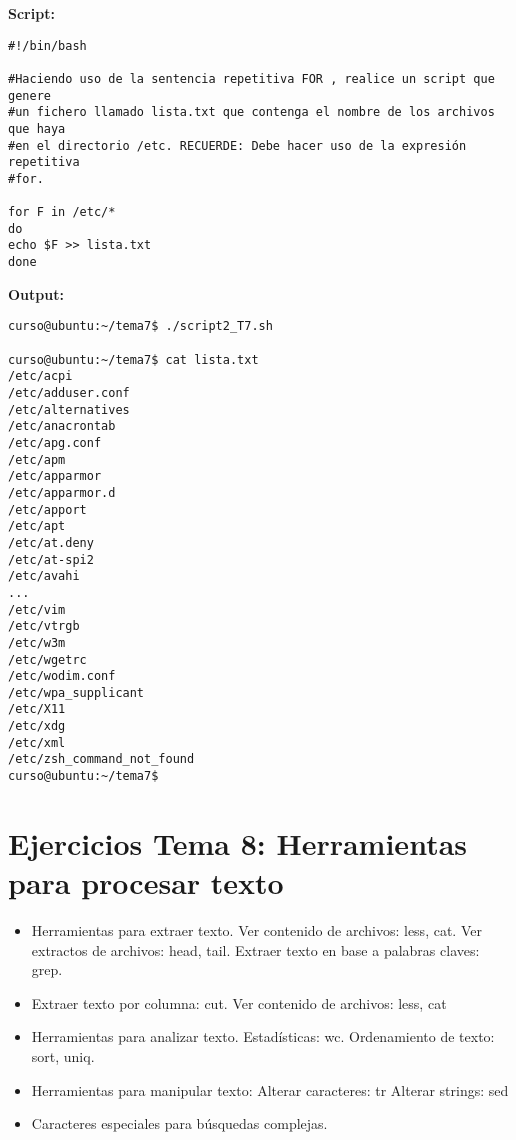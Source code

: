 \documentclass[a4paper,11pt,spanish]{article} %
\newenvironment{myscriptlisting}
{\begin{list}{}{\setlength{\leftmargin}{1em}}\item\scriptsize\bfseries}
{\end{list}}
\begin{document}
\textbf{Script:}

\begin{myscriptlisting}
 \begin{verbatim}
#!/bin/bash

#Haciendo uso de la sentencia repetitiva FOR , realice un script que genere
#un fichero llamado lista.txt que contenga el nombre de los archivos que haya
#en el directorio /etc. RECUERDE: Debe hacer uso de la expresión repetitiva
#for.

for F in /etc/*
do
echo $F >> lista.txt
done
 \end{verbatim}
\end{myscriptlisting}

\textbf{Output:}

\begin{myscriptlisting}
 \begin{verbatim}
curso@ubuntu:~/tema7$ ./script2_T7.sh 

curso@ubuntu:~/tema7$ cat lista.txt 
/etc/acpi
/etc/adduser.conf
/etc/alternatives
/etc/anacrontab
/etc/apg.conf
/etc/apm
/etc/apparmor
/etc/apparmor.d
/etc/apport
/etc/apt
/etc/at.deny
/etc/at-spi2
/etc/avahi
...
/etc/vim
/etc/vtrgb
/etc/w3m
/etc/wgetrc
/etc/wodim.conf
/etc/wpa_supplicant
/etc/X11
/etc/xdg
/etc/xml
/etc/zsh_command_not_found
curso@ubuntu:~/tema7$ 
 \end{verbatim}
\end{myscriptlisting}

\pagebreak

\section{Ejercicios Tema 8: Herramientas para procesar texto}

\begin{itemize}
 \item Herramientas para extraer texto.
  \subitem Ver contenido de archivos: less, cat.
  \subitem Ver extractos de archivos: head, tail.
  \subitem Extraer texto en base a palabras claves: grep.
 \item Extraer texto por columna: cut.
  \subitem Ver contenido de archivos: less, cat
 \item Herramientas para analizar texto.
  \subitem Estadísticas: wc.
  \subitem Ordenamiento de texto: sort, uniq.
 \item Herramientas para manipular texto:
  \subitem Alterar caracteres: tr
  \subitem Alterar strings: sed
 \item Caracteres especiales para búsquedas complejas.
 \end{itemize}
  
\end{document}
